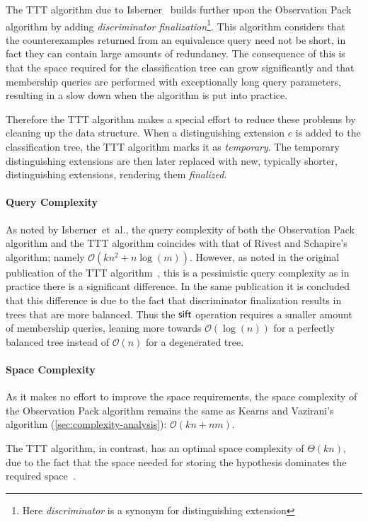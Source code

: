 \documentclass[multi,crop=false,class=article]{standalone}
\begin{document}
The TTT algorithm due to Isberner~\cite{Isberner2014b} builds further upon the
Observation Pack algorithm by adding \textit{discriminator
  finalization}\footnote{Here \textit{discriminator} is a synonym for
  distinguishing extension}. This algorithm considers that the counterexamples
returned from an equivalence query need not be short, in fact they can contain
large amounts of redundancy. The consequence of this is that the space required
for the classification tree can grow significantly and that membership queries
are performed with exceptionally long query parameters, resulting in a slow down
when the algorithm is put into practice.

Therefore the TTT algorithm makes a special effort to reduce these problems by
cleaning up the data structure. When a distinguishing extension $e$ is added to
the classification tree, the TTT algorithm marks it as \textit{temporary}. The
temporary distinguishing extensions are then later replaced with new, typically
shorter, distinguishing extensions, rendering them \textit{finalized}.

\paragraph{Query Complexity} As noted by Isberner~et~al., the query complexity
of both the Observation Pack algorithm and the TTT algorithm coincides with that
of Rivest and Schapire's algorithm; namely $\mathcal{O}(kn^2 + n
\log(m))$. However, as noted in the original publication of the TTT
algorithm~\cite{Isberner2014b}, this is a pessimistic query complexity as in
practice there is a significant difference. In the same publication it is
concluded that this difference is due to the fact that discriminator
finalization results in trees that are more balanced. Thus the $\mathsf{sift}$ operation
requires a smaller amount of membership queries, leaning more towards
$\mathcal{O}(\log(n))$ for a perfectly balanced tree instead of $\mathcal{O}(n)$
for a degenerated tree.

\paragraph{Space Complexity} As it makes no effort to improve the space
requirements, the space complexity of the Observation Pack algorithm remains the
same as Kearns and Vazirani's algorithm (\cref{sec:complexity-analysis}):
$\mathcal{O}(kn + nm)$.

The TTT algorithm, in contrast, has an optimal space complexity of $\Theta(kn)$,
due to the fact that the space needed for storing the hypothesis dominates the
required space~\cite{Isberner2014b,Isberner2015a}.
\end{document}
